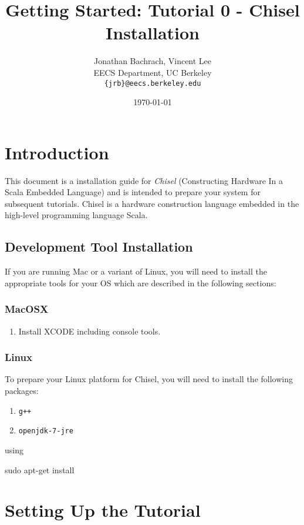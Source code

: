 \documentclass[twocolumn, 10pt]{article}
\title{Getting Started: Tutorial 0 - Chisel Installation}
\author{Jonathan Bachrach, Vincent Lee \\
EECS Department, UC Berkeley\\
{\tt  \{jrb\}@eecs.berkeley.edu}
}
\date{\today}
\begin{document}
\maketitle{}

\section{Introduction}

This document is a installation guide for {\em Chisel} (Constructing
Hardware In a Scala Embedded Language) and is intended to prepare your system for subsequent tutorials.  Chisel is a hardware
construction language embedded in the high-level programming language
Scala.

\subsection{Development Tool Installation}

If you are running Mac or a variant of Linux, you will need to install the appropriate tools for your OS which are described in the following sections:

\subsubsection{MacOSX}

\begin{enumerate}
\item Install XCODE including console tools.
\end{enumerate}

\subsubsection{Linux}

To prepare your Linux platform for Chisel, you will need to install the following packages:

\begin{enumerate}
\item \verb|g++|
\item \verb+openjdk-7-jre+
\end{enumerate}

\noindent
using

\begin{bash}
sudo apt-get install
\end{bash}

\section{Setting Up the Tutorial}
\end{document}
